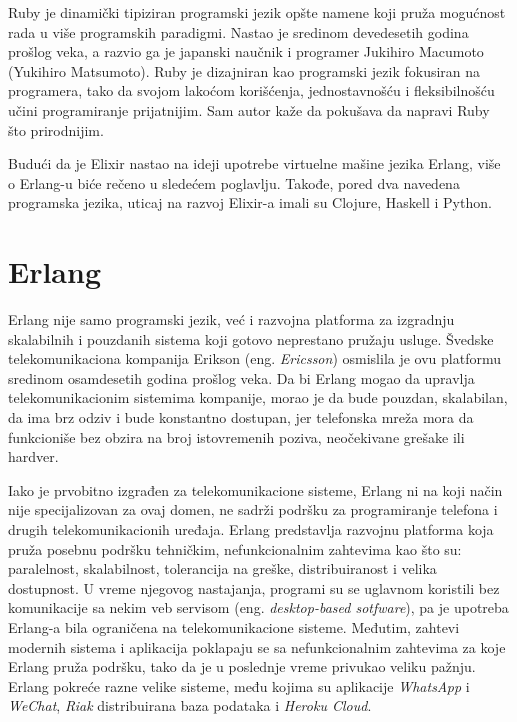 \documentclass[12pt,oneside]{memoir}
\begin{document}
Ruby je dinamički tipiziran programski jezik opšte namene koji pruža mogućnost rada u više
programskih paradigmi. Nastao je sredinom devedesetih godina prošlog veka, a razvio ga je 
japanski naučnik i programer Jukihiro Macumoto (Yukihiro Matsumoto). Ruby je dizajniran
kao programski jezik fokusiran na programera, tako da svojom lakoćom korišćenja, jednostavnošću i 
fleksibilnošću učini programiranje prijatnijim. Sam autor kaže da pokušava da napravi Ruby 
što prirodnijim.  

Budući da je Elixir nastao na ideji upotrebe virtuelne mašine jezika Erlang, više o Erlang-u biće rečeno
u sledećem poglavlju. Takođe, pored dva navedena programska jezika, uticaj na razvoj Elixir-a 
imali su Clojure\cite{clojure}, Haskell\cite{haskell} i Python\cite{python}.

\section{Erlang}
Erlang nije samo programski jezik, već i razvojna platforma za izgradnju skalabilnih i pouzdanih
sistema koji gotovo neprestano pružaju usluge. Švedske telekomunikaciona kompanija Erikson (eng.
\emph{Ericsson}) osmislila je ovu platformu sredinom  osamdesetih godina prošlog veka. 
Da bi Erlang mogao da upravlja telekomunikacionim sistemima kompanije, morao
je da bude pouzdan, skalabilan, da ima brz odziv i bude konstantno dostupan, jer telefonska mreža
mora da funkcioniše bez obzira na broj istovremenih poziva, neočekivane grešake ili hardver.

Iako je prvobitno izgrađen za telekomunikacione sisteme, Erlang ni na koji način nije 
specijalizovan za ovaj domen, ne sadrži podršku za programiranje telefona i drugih 
telekomunikacionih uređaja. Erlang predstavlja razvojnu platforma koja pruža posebnu podršku
tehničkim, nefunkcionalnim zahtevima kao što su: paralelnost, skalabilnost, tolerancija na
greške, distribuiranost i velika dostupnost. U vreme njegovog nastajanja, programi su se uglavnom
koristili bez komunikacije sa nekim veb servisom (eng. \emph{desktop-based sotfware}), pa je 
upotreba Erlang-a bila ograničena na telekomunikacione sisteme. Međutim, zahtevi modernih 
sistema i aplikacija poklapaju se sa nefunkcionalnim zahtevima za koje Erlang pruža podršku, tako
da je u poslednje vreme privukao veliku pažnju. Erlang pokreće razne velike sisteme, među kojima
su aplikacije \emph{WhatsApp}\cite{whatsapp} i \emph{WeChat}\cite{wechat}, \emph{Riak}\cite{riak}  
distribuirana baza podataka i \emph{Heroku Cloud}\cite{heroku}.
\end{document}
